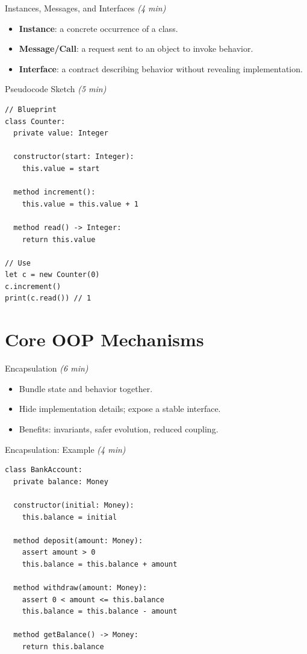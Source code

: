\documentclass[aspectratio=169,11pt]{beamer}
\newcommand{\term}[1]{\textbf{#1}}
\newcommand{\mins}[1]{\textit{(#1 min)}}
\begin{document}
\begin{frame}{Instances, Messages, and Interfaces \mins{4}}
  \begin{itemize}
    \item \term{Instance}: a concrete occurrence of a class.
    \item \term{Message/Call}: a request sent to an object to invoke behavior.
    \item \term{Interface}: a contract describing behavior without revealing implementation.
  \end{itemize}
\end{frame}

\begin{frame}[fragile]{Pseudocode Sketch \mins{5}}
\begin{lstlisting}
// Blueprint
class Counter:
  private value: Integer

  constructor(start: Integer):
    this.value = start

  method increment():
    this.value = this.value + 1

  method read() -> Integer:
    return this.value

// Use
let c = new Counter(0)
c.increment()
print(c.read()) // 1
\end{lstlisting}
\end{frame}

\section{Core OOP Mechanisms}

\begin{frame}{Encapsulation \mins{6}}
  \begin{itemize}
    \item Bundle state and behavior together.
    \item Hide implementation details; expose a stable interface.
    \item Benefits: invariants, safer evolution, reduced coupling.
  \end{itemize}
\end{frame}

\begin{frame}[fragile]{Encapsulation: Example \mins{4}}
\begin{lstlisting}
class BankAccount:
  private balance: Money

  constructor(initial: Money):
    this.balance = initial

  method deposit(amount: Money):
    assert amount > 0
    this.balance = this.balance + amount

  method withdraw(amount: Money):
    assert 0 < amount <= this.balance
    this.balance = this.balance - amount

  method getBalance() -> Money:
    return this.balance
\end{lstlisting}
\end{frame}
\end{document}
